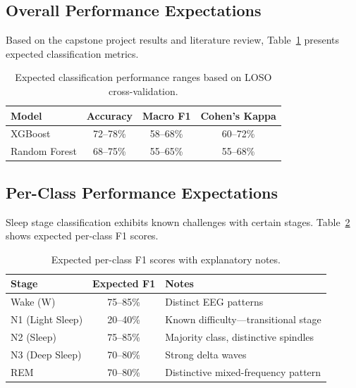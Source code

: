 \subsection{Overall Performance Expectations}

Based on the capstone project results and literature review, Table~\ref{tab:expected_classification} presents expected classification metrics.

\begin{table}[ht]
\centering
\begin{tabular}{|l|c|c|c|}
\hline
\textbf{Model} & \textbf{Accuracy} & \textbf{Macro F1} & \textbf{Cohen's Kappa} \\
\hline
XGBoost & 72--78\% & 58--68\% & 60--72\% \\
\hline
Random Forest & 68--75\% & 55--65\% & 55--68\% \\
\hline
\end{tabular}
\caption{Expected classification performance ranges based on LOSO cross-validation.}
\label{tab:expected_classification}
\end{table}

\subsection{Per-Class Performance Expectations}

Sleep stage classification exhibits known challenges with certain stages. Table~\ref{tab:expected_per_class} shows expected per-class F1 scores.

\begin{table}[ht]
\centering
\begin{tabular}{|l|c|l|}
\hline
\textbf{Stage} & \textbf{Expected F1} & \textbf{Notes} \\
\hline
Wake (W) & 75--85\% & Distinct EEG patterns \\
\hline
N1 (Light Sleep) & 20--40\% & Known difficulty---transitional stage \\
\hline
N2 (Sleep) & 75--85\% & Majority class, distinctive spindles \\
\hline
N3 (Deep Sleep) & 70--80\% & Strong delta waves \\
\hline
REM & 70--80\% & Distinctive mixed-frequency pattern \\
\hline
\end{tabular}
\caption{Expected per-class F1 scores with explanatory notes.}
\label{tab:expected_per_class}
\end{table}

